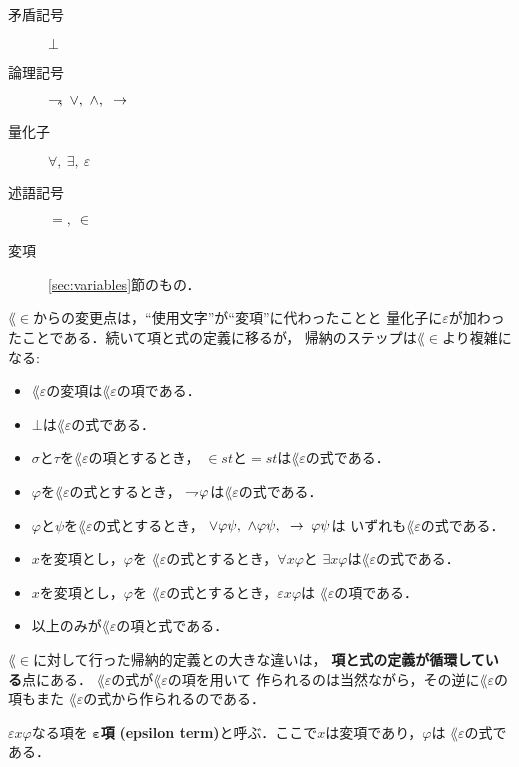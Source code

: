 	\begin{description}
		\item[矛盾記号] $\bot$
		\item[論理記号] $\negation,\ \vee,\ \wedge,\ \rarrow$
		\item[量化子] $\forall,\ \exists,\ \varepsilon$
		\item[述語記号] $=,\ \in$
		\item[変項] \ref{sec:variables}節のもの．
	\end{description}
	
	$\lang{\in}$からの変更点は，``使用文字''が``変項''に代わったことと
	量化子に$\varepsilon$が加わったことである．続いて項と式の定義に移るが，
	帰納のステップは$\lang{\in}$より複雑になる:
	
	\begin{itemize}
		\item $\lang{\varepsilon}$の変項は$\lang{\varepsilon}$の項である．
		\item $\bot$は$\lang{\varepsilon}$の式である．
		\item $\sigma$と$\tau$を$\lang{\varepsilon}$の項とするとき，
			$\in st$と$=st$は$\lang{\varepsilon}$の式である．
		\item $\varphi$を$\lang{\varepsilon}$の式とするとき，
			$\rightharpoondown\hspace{-0.25em} \varphi$は$\lang{\varepsilon}$の式である．
		\item $\varphi$と$\psi$を$\lang{\varepsilon}$の式とするとき，
			$\vee \varphi \psi,\ \wedge \varphi \psi,\ \rarrow \varphi \psi$は
			いずれも$\lang{\varepsilon}$の式である．
		\item $x$を変項とし，$\varphi$を
			$\lang{\varepsilon}$の式とするとき，$\forall x \varphi$と
			$\exists x \varphi$は$\lang{\varepsilon}$の式である．
		\item $x$を変項とし，$\varphi$を
			$\lang{\varepsilon}$の式とするとき，$\varepsilon x \varphi$は
			$\lang{\varepsilon}$の項である．
		\item 以上のみが$\lang{\varepsilon}$の項と式である．
	\end{itemize}
	
	$\lang{\in}$に対して行った帰納的定義との大きな違いは，
	{\bf 項と式の定義が循環している}点にある．
	$\lang{\varepsilon}$の式が$\lang{\varepsilon}$の項を用いて
	作られるのは当然ながら，その逆に$\lang{\varepsilon}$の項もまた
	$\lang{\varepsilon}$の式から作られるのである．
	
	\begin{screen}
		\begin{dfn}[$\varepsilon$項]
			$\varepsilon x \varphi$なる項を
			{\bf ${\boldsymbol \varepsilon}$項}
			{\bf (epsilon term)}と呼ぶ．ここで$x$は変項であり，$\varphi$は
			$\lang{\varepsilon}$の式である．
		\end{dfn}
	\end{screen}
	
